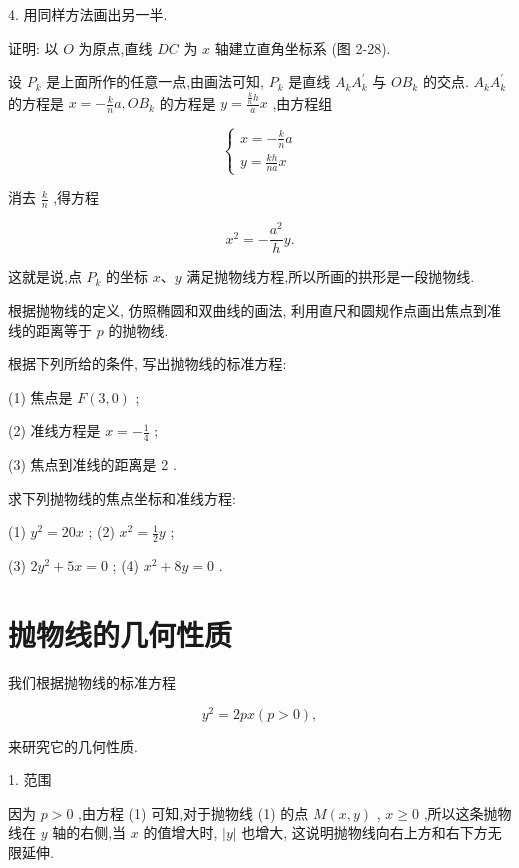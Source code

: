 \documentclass[lang=cn,newtx,10pt,scheme=chinese]{elegantbook}
\begin{document}
4. 用同样方法画出另一半.

证明: 以 \(O\) 为原点,直线 \({DC}\) 为 \(x\) 轴建立直角坐标系 (图 2-28).

设 \({P}_{k}\) 是上面所作的任意一点,由画法可知, \({P}_{k}\) 是直线 \({A}_{k}{A}_{k}^{\prime }\) 与 \(O{B}_{k}\) 的交点. \({A}_{k}{A}_{k}^{\prime }\) 的方程是 \(x = - \frac{k}{n}a,O{B}_{k}\) 的方程是 \(y = \frac{\frac{k}{n}h}{a}x\) ,由方程组

\[
  \left\{ \begin{array}{l} x = - \frac{k}{n}a \\ y = \frac{kh}{na}x \end{array}\right.
\]

消去 \(\frac{k}{n}\) ,得方程

\[
    {x}^{2} = - \frac{{a}^{2}}{h}y.
\]

这就是说,点 \({P}_{k}\) 的坐标 \(x\text{、}y\) 满足抛物线方程,所以所画的拱形是一段抛物线.

\begin{problemset}[练习]

\item 根据抛物线的定义, 仿照椭圆和双曲线的画法, 利用直尺和圆规作点画出焦点到准线的距离等于 \(p\) 的抛物线.

\item 根据下列所给的条件, 写出抛物线的标准方程:

(1) 焦点是 \(F\left( {3,0}\right)\) ;

(2) 准线方程是 \(x = - \frac{1}{4}\) ;

(3) 焦点到准线的距离是 2 .

\item 求下列抛物线的焦点坐标和准线方程:

(1) \({y}^{2} = {20x}\) ; (2) \({x}^{2} = \frac{1}{2}y\) ;

(3) \(2{y}^{2} + {5x} = 0\) ; (4) \({x}^{2} + {8y} = 0\) .

\end{problemset}

\section{抛物线的几何性质}

我们根据抛物线的标准方程

\[
    {y}^{2} = {2px}\left( {p > 0}\right) , \tag{1}
\]

来研究它的几何性质.

1. 范围

因为 \(p > 0\) ,由方程 (1) 可知,对于抛物线 (1) 的点 \(M\left( {x,y}\right)\) , \(x \geq 0\) ,所以这条抛物线在 \(y\) 轴的右侧,当 \(x\) 的值增大时, \(\left| y\right|\) 也增大, 这说明抛物线向右上方和右下方无限延伸.
\end{document}
